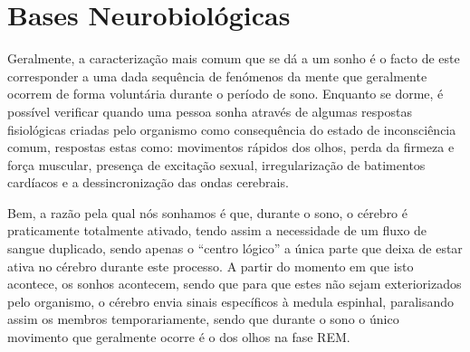 \documentclass{report}
\begin{document}
\section{Bases Neurobiológicas}
Geralmente, a caracterização mais comum que se dá a um sonho é o facto de este corresponder a uma dada sequência de fenómenos da mente que geralmente ocorrem de forma voluntária durante o período de sono. Enquanto se dorme, é possível verificar quando uma pessoa sonha através de algumas respostas fisiológicas criadas pelo organismo como consequência do estado de inconsciência comum, respostas estas como: movimentos rápidos dos olhos, perda da firmeza e força muscular, presença de excitação sexual, irregularização de batimentos cardíacos e a dessincronização das ondas cerebrais.

Bem, a razão pela qual nós sonhamos é que, durante o sono, o cérebro é praticamente totalmente ativado, tendo assim a necessidade de um fluxo de sangue duplicado, sendo apenas o “centro lógico”  a única parte que deixa de estar ativa no cérebro durante este processo.
A partir do momento em que isto acontece, os sonhos acontecem, sendo que para que estes não sejam exteriorizados pelo organismo, o cérebro envia sinais específicos à medula espinhal, paralisando assim os membros temporariamente, sendo que durante o sono o único movimento que geralmente ocorre é o dos olhos na fase REM.
\end{document}
